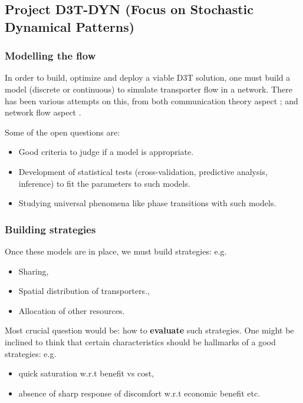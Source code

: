 \subsection*{Project D3T-DYN (Focus on Stochastic Dynamical Patterns)}

\subsubsection*{Modelling the flow}
In order to  build, optimize and deploy a viable D3T solution, one must build a model
(discrete or continuous) to simulate transporter flow in a network. There has been various attempts on this,
from both communication theory aspect \cite{zhang_communication_2011, arenas_communication_2001}; and network flow aspect
\cite{de_martino_minimal_2009,sole-ribalta_model_2016,tan_hybrid_2013}. 

Some of the open questions are:
\begin{itemize}
\item Good criteria to judge if a model is appropriate. 
\item Development of statistical tests (cross-validation, predictive analysis, inference) to fit the parameters to such models. 
\item Studying universal phenomena like phase transitions with such models.
\end{itemize}

\subsubsection*{Building strategies}
Once these models are in place, we must build strategies: e.g. 
\begin{itemize}
\item Sharing,
\item Spatial distribution of transporters.,
\item Allocation of other resources.
\end{itemize}

Most crucial question would be: how to {\bf evaluate} such strategies. One might be inclined to think that certain characteristics
should be hallmarks of a good strategies: e.g. 
\begin{itemize}
\item quick saturation w.r.t benefit vs cost,
\item absence of sharp response of discomfort w.r.t economic benefit etc.
\end{itemize}